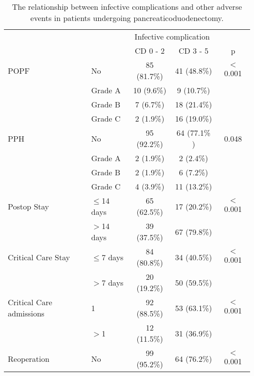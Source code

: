\begin{table}[p]
	\centering
	\caption{The relationship between infective complications and other adverse events in patients undergoing pancreaticoduodenectomy.}
	\label{table:crp_comp_infect_vs_other_complications}
	\renewcommand{\arraystretch}{1.2} %
	\setlength{\tabcolsep}{9pt} %
	\begin{tabular}{|l l | c c |c|}
		\hline
		                         &               & \multicolumn{2}{c|}{Infective complication} & \\
		                         &               & CD 0 - 2     & CD 3 - 5     & p              \\ \hline
		POPF                     & No            & 85 (81.7\%)  & 41 (48.8\%)  & $<$0.001       \\
		                         & Grade A       & 10 (9.6\%)   & 9 (10.7\%)   &  \\
		                         & Grade B       & 7 (6.7\%)    & 18 (21.4\%)  &  \\
		                         & Grade C       & 2 (1.9\%)    & 16 (19.0\%)  &  \\
		PPH                      & No            & 95 (92.2\%)  & 64 (77.1\% ) & 0.048          \\
		                         & Grade A       & 2 (1.9\%)    & 2 (2.4\%)    &  \\
		                         & Grade B       & 2 (1.9\%)    & 6 (7.2\%)    &  \\
		                         & Grade C       & 4  (3.9\%)   & 11 (13.2\%)  &  \\
		Postop Stay              & $\leq$14 days & 65 (62.5\%)  & 17 (20.2\%)  & $<$0.001       \\
		                         & $>$14 days    & 39 (37.5\%)  & 67 (79.8\%)  &  \\
		Critical Care Stay       & $\leq$7 days  & 84 (80.8\%)  & 34 (40.5\%)  & $<$0.001       \\
		                         & $>$7 days     & 20 (19.2\%)  & 50 (59.5\%)  &  \\
		Critical Care admissions & 1             & 92 (88.5\%)  & 53 (63.1\%)  & $<$0.001       \\
		                         & $>$1          & 12 (11.5\%)  & 31 (36.9\%)  &  \\
		Reoperation              & No            & 99 (95.2\%)  & 64 (76.2\%)  & $<$0.001       \\

\end{tabular}
\end{table}
